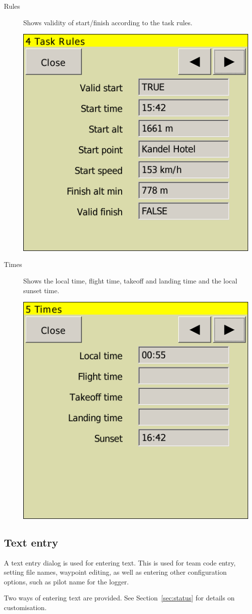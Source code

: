 \documentclass[a4paper,12pt]{refrep}
\begin{document}
\begin{description}
\item[Rules] Shows validity of start/finish according to the task rules.
\begin{center}
\includegraphics[angle=0,width=0.5\linewidth,keepaspectratio='true']{figures/status-rules.png}
\end{center}

\item[Times]  Shows the local time, flight time, takeoff and landing time and
the local sunset time.
\begin{center}
\includegraphics[angle=0,width=0.5\linewidth,keepaspectratio='true']{figures/status-times.png}
\end{center}
\end{description}

\subsection*{Text entry}
A text entry dialog is used for entering text.  This is used for team
code entry, setting file names, waypoint editing, as well as entering
other configuration options, such as pilot name for the logger.

Two ways of entering text are provided. See Section~\ref{sec:status} for details on customisation.
\end{document}
